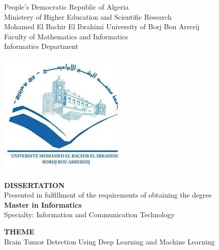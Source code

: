 
\thispagestyle{empty}
\begin{center}
\begin{spacing}{1.15}
  People’s Democratic Republic of Algeria \\
  Ministery of Higher Education and Scientific Research \\
  Mohamed El Bachir El Ibrahimi University of Borj Bou Arrerij\\
  Faculty of Mathematics and Informatics\\
  Informatics Department\\
\vspace{0.5cm}

\includegraphics[scale=0.5]{Images/logo.jpeg}


\fontsize{13}{15}\selectfont \textbf{DISSERTATION}\\
Presented in fulfillment of the requirements of obtaining the degree\\
\fontsize{13}{15}\selectfont \textbf{Master in Informatics} \\
Specialty: Information and Communication Technology
 

\vspace{1.5cm}

\fontsize{19}{22}\selectfont \textbf{THEME} \\
\fontsize{19}{22}\selectfont Brain Tumor Detection Using Deep Learning and Machine Learning\\

\end{spacing}
\end{center}

\vspace{0.5cm}

